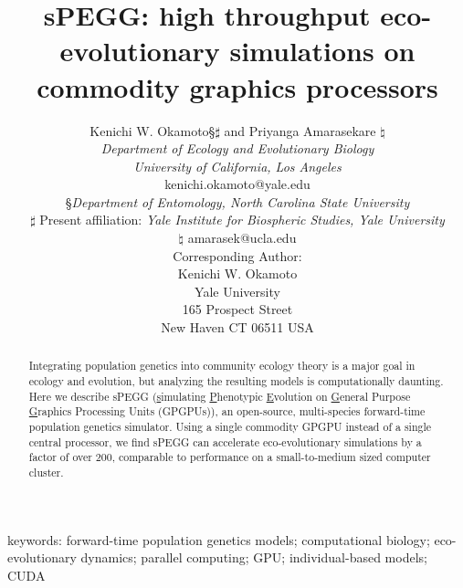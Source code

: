 \documentclass[1p,numbered]{article}
\begin{document}
\begin{titlepage}

\thispagestyle{empty}
\title{sPEGG: high throughput eco-evolutionary simulations on commodity graphics processors}
\author{Kenichi W. Okamoto\dag \ddag \S $\sharp$ { and} Priyanga Amarasekare \dag $\natural$ \\ \dag \textit{Department of Ecology and Evolutionary Biology} \\ \textit{University of California, Los Angeles}\\ 
\ddag kenichi.okamoto@yale.edu\\
\S \textit{Department of Entomology, North Carolina State University}\\
$\sharp$ Present affiliation: \textit{Yale Institute for Biospheric Studies, Yale University} \\
$\natural$ amarasek@ucla.edu\\
Corresponding Author: \\
Kenichi W. Okamoto \\ 
Yale University \\ 
165 Prospect Street \\
New Haven CT 06511 USA \\
}

\maketitle
\thispagestyle{empty}
\end{titlepage}
\begin{abstract}
Integrating population genetics into community ecology theory is a major goal in ecology and evolution, but analyzing the resulting models is computationally daunting. Here we describe sPEGG (\underline{s}imulating \underline{P}henotypic \underline{E}volution on \underline{G}eneral Purpose \underline{G}raphics Processing Units (GPGPUs)), an open-source, multi-species forward-time population genetics simulator. Using a single commodity GPGPU instead of a single central processor, we find sPEGG can accelerate eco-evolutionary simulations by a factor of over 200, comparable to performance on a small-to-medium sized computer cluster. 

\end{abstract}
keywords: forward-time population genetics models; computational biology; eco-evolutionary dynamics; parallel computing; GPU; individual-based models; CUDA
\end{document}
